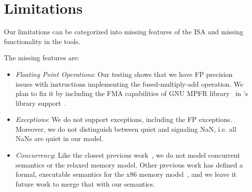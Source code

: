 \section{Limitations}\label{sec:limit}
Our limitations can be categorized into missing features of the \ISA ISA and missing functionality in the \K tools.

The missing \ISA features are:
%
\begin{itemize}
 \item {\em Floating Point Operations\/}: Our testing shows that we have FP precision issues with instructions implementing the fused-multiply-add operation. We plan to fix it by including the FMA capabilities of GNU MPFR library~\cite{GNUMPFR} in \K's library support~\cite{MPFRJAVA}.
 \item {\em Exceptions\/}: We do not support exceptions, including the FP exceptions. Moreover, we do not distinguish between quiet and signaling NaN, i.e. all NaNs are quiet in our model.
 \item {\em Concurrency\/}: Like the closest previous work~\cite{Goel:FMCAD14,Heule2016a}, we do not model concurrent semantics or the relaxed memory model. Other previous work has defined a formal, executable semantics for the x86 memory model~\cite{Sarkar:POPL09,Owens:x86-TSO}, and we leave it future work to merge that with our semantics.   
\end{itemize}
